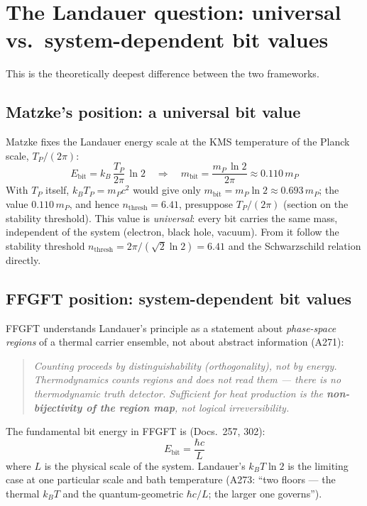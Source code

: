 \section{The Landauer question: universal vs.\ system-dependent bit values}

This is the theoretically deepest difference between the two frameworks.

\subsection{Matzke's position: a universal bit value}

Matzke fixes the Landauer energy scale at the KMS temperature of the Planck scale, $T_P/(2\pi)$:
\begin{equation}
  E_{\mathrm{bit}} = k_B\,\frac{T_P}{2\pi}\,\ln 2 \quad\Rightarrow\quad
  m_{\mathrm{bit}} = \frac{m_P\,\ln 2}{2\pi} \approx 0.110\,m_P
  \tag{Matzke, Ch.\ 6}
\end{equation}
With $T_P$ itself, $k_BT_P = m_Pc^2$ would give only
$m_{\mathrm{bit}} = m_P\ln 2 \approx 0.693\,m_P$; the value $0.110\,m_P$, and hence
$n_{\mathrm{thresh}} = 6.41$, presuppose $T_P/(2\pi)$ (section on the stability threshold).
This value is \emph{universal}: every bit carries the same mass,
independent of the system (electron, black hole, vacuum).
From it follow the stability threshold
$n_{\mathrm{thresh}} = 2\pi/(\sqrt{2}\ln 2) = 6.41$ and the
Schwarzschild relation directly.

\subsection{FFGFT position: system-dependent bit values}

FFGFT understands Landauer's principle as a statement about
\emph{phase-space regions} of a thermal carrier ensemble, not about
abstract information (A271):

\begin{quote}
  \itshape
  Counting proceeds by distinguishability (orthogonality), not by
  energy. Thermodynamics counts regions and does not read them —
  there is no thermodynamic truth detector.
  Sufficient for heat production is the \textbf{non-bijectivity of the
  region map}, not logical irreversibility.
\end{quote}

\medskip
The fundamental bit energy in FFGFT is (Docs.\ 257, 302):
\begin{equation}
  E_{\mathrm{bit}} = \frac{\hbar c}{L}
  \tag{FFGFT, Doc.\ 257}
\end{equation}
where $L$ is the physical scale of the system.
Landauer's $k_B T\ln 2$ is the limiting case at one particular scale
and bath temperature (A273: \enquote{two floors — the thermal $k_BT$
and the quantum-geometric $\hbar c/L$; the larger one governs}).

